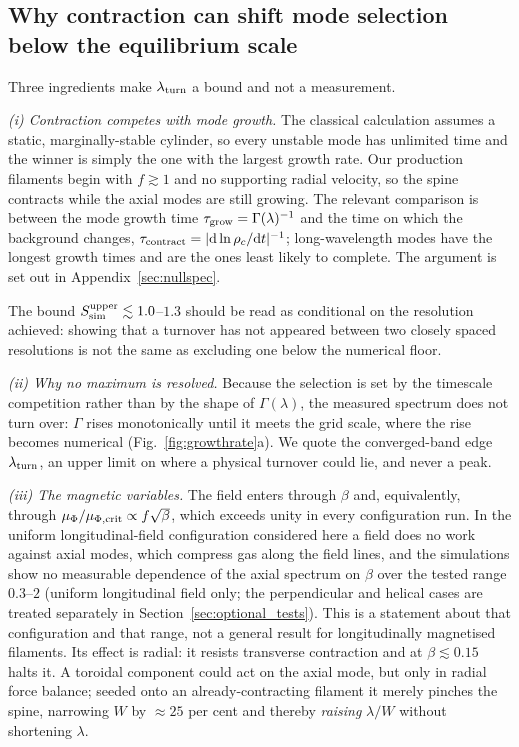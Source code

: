 \documentclass[usenatbib,twoside,twocolumn]{mnras}
\begin{document}
\subsection{Why contraction can shift mode selection below the equilibrium scale}
\label{sec:whyupper}

Three ingredients make $\lambda_{\rm turn}$ a bound and not a measurement.

\emph{(i) Contraction competes with mode growth.} The classical calculation assumes a static, marginally-stable cylinder, so every unstable mode has unlimited time and the winner is simply the one with the largest growth rate. Our production filaments begin with $f\gtrsim1$ and no supporting radial velocity, so the spine contracts while the axial modes are still growing. The relevant comparison is between the mode growth time $\tau_{\rm grow}=\Gamma(\lambda)^{-1}$ and the time on which the background changes, $\tau_{\rm contract}=|{\rm d}\ln\rho_c/{\rm d}t|^{-1}$; long-wavelength modes have the longest growth times and are the ones least likely to complete. The argument is set out in Appendix~\ref{sec:nullspec}.

The bound $S_{\rm sim}^{\rm upper}\lesssim1.0$--$1.3$ should be read as conditional on the resolution achieved: showing that a turnover has not appeared between two closely spaced resolutions is not the same as excluding one below the numerical floor.

\emph{(ii) Why no maximum is resolved.} Because the selection is set by the timescale competition rather than by the shape of $\Gamma(\lambda)$, the measured spectrum does not turn over: $\Gamma$ rises monotonically until it meets the grid scale, where the rise becomes numerical (Fig.~\ref{fig:growthrate}a). We quote the converged-band edge $\lambda_{\rm turn}$, an upper limit on where a physical turnover could lie, and never a peak.

\emph{(iii) The magnetic variables.} The field enters through $\beta$ and, equivalently, through $\mu_\Phi/\mu_{\Phi,\rm crit}\propto f\sqrt{\beta}$, which exceeds unity in every configuration run. In the uniform longitudinal-field configuration considered here a field does no work against axial modes, which compress gas along the field lines, and the simulations show no measurable dependence of the axial spectrum on $\beta$ over the tested range $0.3$--$2$ (uniform longitudinal field only; the perpendicular and helical cases are treated separately in Section~\ref{sec:optional_tests}). This is a statement about that configuration and that range, not a general result for longitudinally magnetised filaments. Its effect is radial: it resists transverse contraction and at $\beta\lesssim0.15$ halts it. A toroidal component could act on the axial mode, but only in radial force balance; seeded onto an already-contracting filament it merely pinches the spine, narrowing $W$ by $\approx25$ per cent and thereby \emph{raising} $\lambda/W$ without shortening $\lambda$.
\end{document}
